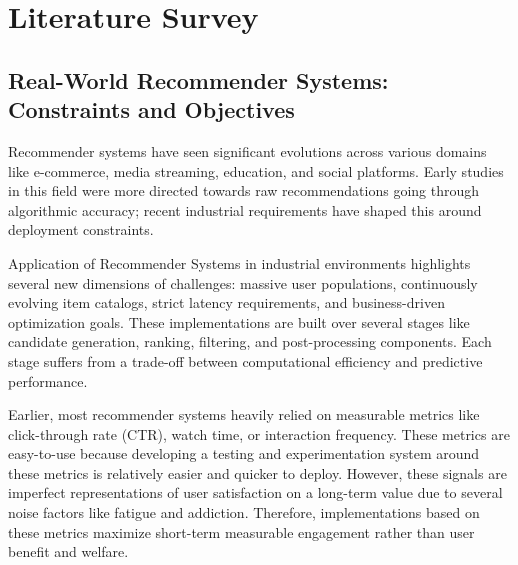 \section{Literature Survey}


\subsection{Real-World Recommender Systems: Constraints and Objectives}

Recommender systems have seen significant evolutions across various domains
like e-commerce, media streaming, education, and social platforms.
\cite{zou2025surveyrealworldrecommendersystems}
Early studies in this field were more directed towards raw recommendations
going through algorithmic accuracy; recent industrial requirements have 
shaped this around deployment constraints.

Application of Recommender Systems in industrial environments highlights 
several new dimensions of challenges: massive user populations, continuously 
evolving item catalogs, strict latency requirements, and business-driven 
optimization goals.
\cite{zou2025surveyrealworldrecommendersystems}
These implementations are built over several stages like candidate generation, 
ranking, filtering, and post-processing components.
Each stage suffers from a trade-off between computational efficiency and 
predictive performance.

Earlier, most recommender systems heavily relied on measurable metrics like 
click-through rate (CTR), watch time, or interaction frequency.
These metrics are easy-to-use because developing a testing and experimentation
system around these metrics is relatively easier and quicker to deploy.
However, these signals are imperfect representations of user satisfaction
on a long-term value due to several noise factors like fatigue and addiction.
Therefore, implementations based on these metrics maximize short-term 
measurable engagement rather than user benefit and welfare.
\cite{zou2025surveyrealworldrecommendersystems}


